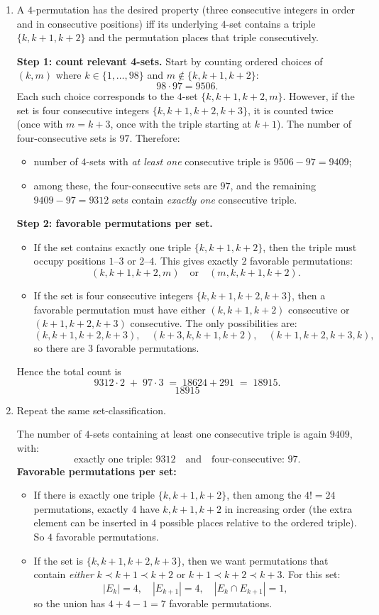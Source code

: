 \documentclass[12pt]{article}
\begin{document}
\begin{enumerate}[label=(\alph*)]
\item A $4$-permutation has the desired property (three consecutive integers in order and in consecutive positions) iff its underlying $4$-set contains a triple $\{k,k+1,k+2\}$ and the permutation places that triple consecutively.

\textbf{Step 1: count relevant 4-sets.}
Start by counting ordered choices of $(k,m)$ where $k\in\{1,\dots,98\}$ and $m\notin\{k,k+1,k+2\}$:
\[
98\cdot 97 = 9506.
\]
Each such choice corresponds to the $4$-set $\{k,k+1,k+2,m\}$. However, if the set is four consecutive integers $\{k,k+1,k+2,k+3\}$, it is counted twice (once with $m=k+3$, once with the triple starting at $k+1$). The number of four-consecutive sets is $97$. Therefore:
\begin{itemize}[leftmargin=*]
\item number of $4$-sets with \emph{at least one} consecutive triple is $9506-97=9409$;
\item among these, the four-consecutive sets are $97$, and the remaining $9409-97=9312$ sets contain \emph{exactly one} consecutive triple.
\end{itemize}

\textbf{Step 2: favorable permutations per set.}
\begin{itemize}[leftmargin=*]
\item If the set contains exactly one triple $\{k,k+1,k+2\}$, then the triple must occupy positions $1$--$3$ or $2$--$4$. This gives exactly $2$ favorable permutations:
\[
(k,k+1,k+2,m)\quad\text{or}\quad (m,k,k+1,k+2).
\]
\item If the set is four consecutive integers $\{k,k+1,k+2,k+3\}$, then a favorable permutation must have either $(k,k+1,k+2)$ consecutive or $(k+1,k+2,k+3)$ consecutive. The only possibilities are:
\[
(k,k+1,k+2,k+3),\quad (k+3,k,k+1,k+2),\quad (k+1,k+2,k+3,k),
\]
so there are $3$ favorable permutations.
\end{itemize}

Hence the total count is
\[
9312\cdot 2 \;+\; 97\cdot 3 \;=\; 18624+291 \;=\; 18915.
\]
\[
\boxed{18915}
\]

\item Repeat the same set-classification.

The number of $4$-sets containing at least one consecutive triple is again $9409$, with:
\[
\text{exactly one triple: }9312\quad\text{and}\quad \text{four-consecutive: }97.
\]
\textbf{Favorable permutations per set:}
\begin{itemize}[leftmargin=*]
\item If there is exactly one triple $\{k,k+1,k+2\}$, then among the $4!=24$ permutations, exactly $4$ have $k,k+1,k+2$ in increasing order (the extra element can be inserted in $4$ possible places relative to the ordered triple). So $4$ favorable permutations.
\item If the set is $\{k,k+1,k+2,k+3\}$, then we want permutations that contain \emph{either} $k\prec k+1\prec k+2$ or $k+1\prec k+2\prec k+3$. For this set:
\[
|E_k|=4,\quad |E_{k+1}|=4,\quad |E_k\cap E_{k+1}|=1,
\]
so the union has $4+4-1=7$ favorable permutations.
\end{itemize}


\end{enumerate}
\end{document}
